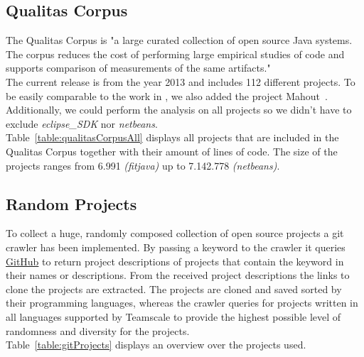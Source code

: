 \subsection{Qualitas Corpus}
\label{section:qualitasCorpus}
The Qualitas Corpus is "a large curated collection of open source Java systems. The corpus reduces the cost of performing
large empirical studies of code and supports comparison of measurements of the same artifacts."\cite[p.~1]{TemperoEwanandAnslowCraigandDietrichJensandHanTedandLiJingandLumpeMarkusandMeltonHaydenandNoble2010a}\\
The current release is from the year 2013 and includes 112 different projects. To be easily comparable to the work in \cite{Bernwieser2014}, we also added the project Mahout~\cite{ApacheSoftwareFoundation}.\\
Additionally, we could perform the analysis on all projects so we didn't have to exclude \textit{eclipse\_SDK} nor \textit{netbeans}.\\
Table~\ref{table:qualitasCorpusAll} displays all projects that are included in the Qualitas Corpus together with their amount of lines of code. The size of the projects ranges from 6.991 \textit{(fitjava)} up to 7.142.778 \textit{(netbeans)}.


\subsection{Random Projects}
\label{section:randomGitProjects}
To collect a huge, randomly composed collection of open source projects a git crawler has been implemented.
By passing a keyword to the crawler it queries \href{github.com}{GitHub} to return project descriptions of projects that contain the keyword in their names or descriptions. From the received project descriptions the links to clone the projects are extracted. The projects are cloned and saved sorted by their programming languages, whereas the crawler queries for projects written in all languages supported by Teamscale to provide the highest possible level of randomness and diversity for the projects.\\
Table~\ref{table:gitProjects} displays an overview over the projects used.


